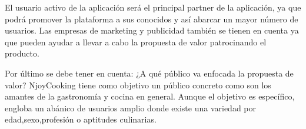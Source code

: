 \vspace{5 mm}

El usuario activo de la aplicación será el principal partner de la aplicación, ya que podrá promover la plataforma a sus conocidos y así abarcar un
mayor número de usuarios. Las empresas de marketing y publicidad también se tienen en cuenta ya que pueden ayudar a llevar a cabo la propuesta de
valor patrocinando el producto.


\vspace{5 mm}

Por último se debe tener en cuenta: ¿A qué público va enfocada la propuesta de valor? NjoyCooking tiene como objetivo un público concreto como son
los amantes de la gastronomía y cocina en general. Aunque el objetivo es específico, engloba un abánico de usuarios amplio donde existe una variedad
por edad,sexo,profesión o aptitudes culinarias.
